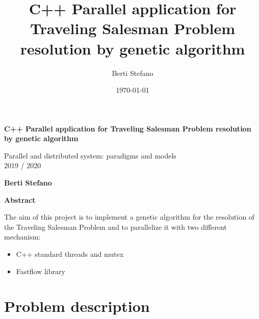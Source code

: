 \documentclass{article}
\title{C++ Parallel application for Traveling Salesman Problem resolution by genetic algorithm}
\author{Berti Stefano}
\date{\today}
\begin{document}
    \thispagestyle{plain}
    \begin{center}
        \Large
        \textbf{C++ Parallel application for Traveling Salesman Problem resolution by genetic algorithm}

        \vspace{0.4cm}
        \large Parallel and distributed system: paradigms and models
        \\2019 / 2020

        \vspace{0.4cm}
        \textbf{Berti Stefano}

        \vspace{0.9cm}
        \textbf{Abstract}
    \end{center}
    The aim of this project is to implement a genetic algorithm for the resolution of the Traveling Salesman Problem and to parallelize it with two different mechanism:
    \begin{itemize}
	\item C++ standard threads and mutex
	\item Fastflow library
    \end{itemize}
    \section{Problem description}\label{sec:s1}
\end{document}
